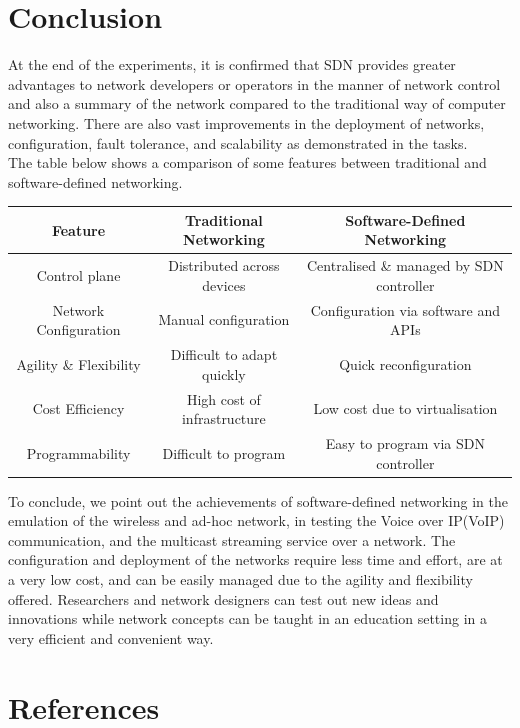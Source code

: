 \documentclass{article}
\begin{document}
\section{Conclusion}
At the end of the experiments, it is confirmed that SDN provides greater advantages to network developers or operators in the manner of network control and also a summary of the network compared to the traditional way of computer networking. There are also vast improvements in the deployment of networks, configuration, fault tolerance, and scalability as demonstrated in the tasks. \\ The table below shows a comparison of some features between traditional and software-defined networking.
	\begin{table}[h]
		\small
		\centering
		\begin{tabular}{|c|c|c|}
			\hline
			Feature & Traditional Networking & Software-Defined Networking \\
			\hline
			Control plane & Distributed across devices & Centralised \& managed by SDN controller \\
			Network Configuration & Manual configuration & Configuration via software and APIs \\
			Agility \& Flexibility & Difficult to adapt quickly & Quick reconfiguration \\
			Cost Efficiency & High cost of infrastructure & Low cost due to virtualisation \\
			Programmability & Difficult to program & Easy to program via SDN controller \\
			\hline
		\end{tabular}
	\end{table}
\par To conclude, we point out the achievements of software-defined networking in the emulation of the wireless and ad-hoc network, in testing the Voice over IP(VoIP) communication, and the multicast streaming service over a network. The configuration and deployment of the networks require less time and effort, are at a very low cost, and can be easily managed due to the agility and flexibility offered. Researchers and network designers can test out new ideas and innovations while network concepts can be taught in an education setting in a very efficient and convenient way.

\newpage
\section{References}


\end{document}
